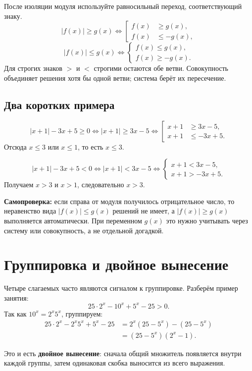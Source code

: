 \documentclass[a4paper,12pt]{article}
\newcommand{\key}[1]{\textcolor{accent}{\textbf{#1}}}
\begin{document}
После изоляции модуля используйте равносильный переход, соответствующий знаку.
\[
|f(x)|\ge g(x)
\iff
\left[
\begin{aligned}
f(x)&\ge g(x),\\
f(x)&\le-g(x),
\end{aligned}
\right.
\]
\[
|f(x)|\le g(x)
\iff
\begin{cases}
f(x)\le g(x),\\
f(x)\ge-g(x).
\end{cases}
\]
Для строгих знаков $>$ и $<$ строгими остаются обе ветви. Совокупность объединяет решения хотя бы одной ветви; система берёт их пересечение.

\subsection{Два коротких примера}

\[
|x+1|-3x+5\ge0
\iff |x+1|\ge3x-5
\iff
\left[
\begin{aligned}
x+1&\ge3x-5,\\
x+1&\le-3x+5.
\end{aligned}
\right.
\]
Отсюда $x\le3$ или $x\le1$, то есть $\boxed{x\le3}$.

\[
|x+1|-3x+5<0
\iff |x+1|<3x-5
\iff
\begin{cases}
x+1<3x-5,\\
x+1>-3x+5.
\end{cases}
\]
Получаем $x>3$ и $x>1$, следовательно $\boxed{x>3}$.

\key{Самопроверка:} если справа от модуля получилось отрицательное число, то неравенство вида $|f(x)|\le g(x)$ решений не имеет, а $|f(x)|\ge g(x)$ выполняется автоматически. При переменном $g(x)$ это нужно учитывать через систему или совокупность, а не отдельной догадкой.

\section{Группировка и двойное вынесение}

Четыре слагаемых часто являются сигналом к группировке. Разберём пример занятия:
\[
25\cdot2^x-10^x+5^x-25>0.
\]
Так как $10^x=2^x5^x$, группируем:
\begin{align*}
25\cdot2^x-2^x5^x+5^x-25
&=2^x(25-5^x)-(25-5^x)\\
&=(25-5^x)(2^x-1).
\end{align*}

Это и есть \key{двойное вынесение}: сначала общий множитель появляется внутри каждой группы, затем одинаковая скобка выносится из всего выражения.
\end{document}
